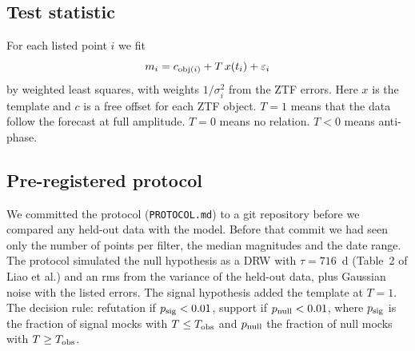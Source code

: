 \documentclass[11pt]{article}
\newcommand{\Tobs}{T_{\rm obs}}
\newcommand{\psig}{p_{\rm sig}}
\newcommand{\pnull}{p_{\rm null}}
\begin{document}
\subsection{Test statistic}
For each listed point $i$ we fit
\begin{equation}
m_i = c_{{\rm obj}(i)} + T\,x(t_i) + \varepsilon_i
\end{equation}
by weighted least squares, with weights $1/\sigma_i^2$ from the ZTF errors. Here $x$ is the template and $c$ is a free offset for each ZTF object. $T = 1$ means that the data follow the forecast at full amplitude. $T = 0$ means no relation. $T < 0$ means anti-phase.

\subsection{Pre-registered protocol}
We committed the protocol (\texttt{PROTOCOL.md}) to a git repository before we compared any held-out data with the model. Before that commit we had seen only the number of points per filter, the median magnitudes and the date range. The protocol simulated the null hypothesis as a DRW with $\tau = 716$~d (Table~2 of Liao et al.) and an rms from the variance of the held-out data, plus Gaussian noise with the listed errors. The signal hypothesis added the template at $T = 1$. The decision rule: refutation if $\psig < 0.01$, support if $\pnull < 0.01$, where $\psig$ is the fraction of signal mocks with $T \le \Tobs$ and $\pnull$ the fraction of null mocks with $T \ge \Tobs$.
\end{document}
